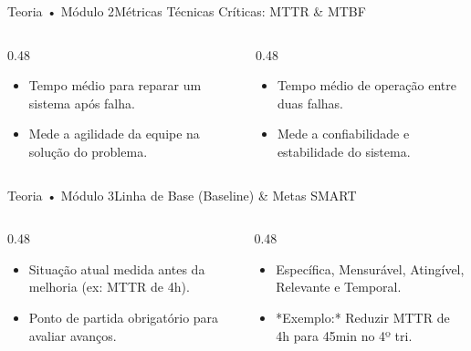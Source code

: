 \begin{senaiframe}{Teoria • Módulo 2}{Métricas Técnicas Críticas: MTTR \& MTBF}
  \begin{columns}[t]
    \begin{column}{0.48\textwidth}
      \begin{tcolorbox}[senairedcard, title={MTTR (Mean Time to Repair)}]
        \begin{itemize}
          \item Tempo médio para reparar um sistema após falha.
          \item Mede a agilidade da equipe na solução do problema.
        \end{itemize}
      \end{tcolorbox}
    \end{column}
    \begin{column}{0.48\textwidth}
      \begin{tcolorbox}[senaigreencard, title={MTBF (Mean Time Between Failures)}]
        \begin{itemize}
          \item Tempo médio de operação entre duas falhas.
          \item Mede a confiabilidade e estabilidade do sistema.
        \end{itemize}
      \end{tcolorbox}
    \end{column}
  \end{columns}
\end{senaiframe}

\begin{senaiframe}{Teoria • Módulo 3}{Linha de Base (Baseline) \& Metas SMART}
  \begin{columns}[t]
    \begin{column}{0.48\textwidth}
      \begin{tcolorbox}[senaiambercard, title={Linha de Base (Baseline)}]
        \begin{itemize}
          \item Situação atual medida antes da melhoria (ex: MTTR de 4h).
          \item Ponto de partida obrigatório para avaliar avanços.
        \end{itemize}
      \end{tcolorbox}
    \end{column}
    \begin{column}{0.48\textwidth}
      \begin{tcolorbox}[senaigreencard, title={Meta SMART}]
        \begin{itemize}
          \item Específica, Mensurável, Atingível, Relevante e Temporal.
          \item *Exemplo:* Reduzir MTTR de 4h para 45min no 4º tri.
        \end{itemize}
      \end{tcolorbox}
    \end{column}
  \end{columns}
\end{senaiframe}

